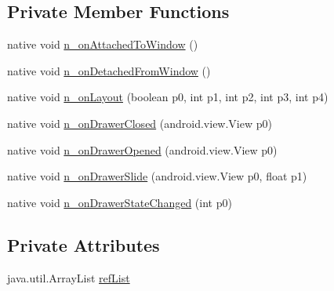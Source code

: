 \subsection*{Private Member Functions}
\begin{CompactItemize}
\item 
native void \hyperlink{classmd5270abb39e60627f0f200893b490a1ade_1_1_master_detail_page_renderer_9965cdcc07d87795bfb81dd5b712b48c}{n\_\-onAttachedToWindow} ()
\item 
native void \hyperlink{classmd5270abb39e60627f0f200893b490a1ade_1_1_master_detail_page_renderer_de37b6635f9adea7b02613c18dcc8b03}{n\_\-onDetachedFromWindow} ()
\item 
native void \hyperlink{classmd5270abb39e60627f0f200893b490a1ade_1_1_master_detail_page_renderer_2519f421ac67bb3d7aa474954ea0bc1f}{n\_\-onLayout} (boolean p0, int p1, int p2, int p3, int p4)
\item 
native void \hyperlink{classmd5270abb39e60627f0f200893b490a1ade_1_1_master_detail_page_renderer_8666e30b25f93863a684a6600cba82fb}{n\_\-onDrawerClosed} (android.view.View p0)
\item 
native void \hyperlink{classmd5270abb39e60627f0f200893b490a1ade_1_1_master_detail_page_renderer_d11746681481fe5d3987896458f482a0}{n\_\-onDrawerOpened} (android.view.View p0)
\item 
native void \hyperlink{classmd5270abb39e60627f0f200893b490a1ade_1_1_master_detail_page_renderer_5e24114f4e1c5b9d6c8a97d43cfbec99}{n\_\-onDrawerSlide} (android.view.View p0, float p1)
\item 
native void \hyperlink{classmd5270abb39e60627f0f200893b490a1ade_1_1_master_detail_page_renderer_07c5fd30cfd0ace9330580cfae8f2593}{n\_\-onDrawerStateChanged} (int p0)
\end{CompactItemize}
\subsection*{Private Attributes}
\begin{CompactItemize}
\item 
java.util.ArrayList \hyperlink{classmd5270abb39e60627f0f200893b490a1ade_1_1_master_detail_page_renderer_395b49a7122df4c3416eb8930f6d33c3}{refList}
\end{CompactItemize}


